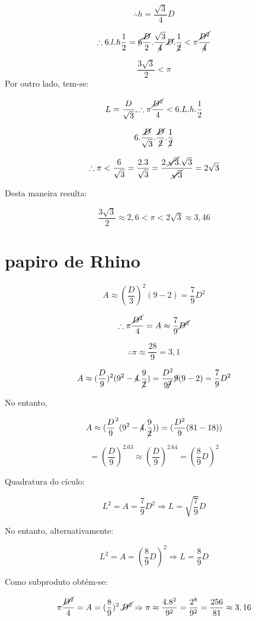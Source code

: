 \documentclass[a4paper, 12pt]{article}
\begin{document}
\[\therefore h= \frac{\sqrt{3}}{4}D\]

\[\therefore 6.l.h\frac{1}{2} = \cancel{6} \frac{\cancel{D}}{2}.\frac{\sqrt{3}}{\cancel{4}}\cancel{D}.\frac{1}{\cancel{2}} <\pi\frac{\cancel{D^2}}{\cancel{4}}\]

\[\frac{3\sqrt{3}}{2} < \pi\]
Por outro lado, tem-se:

\[L= \frac{D}{\sqrt{3}}, \therefore \pi \frac{\cancel{D^2}}{4} < 6.L.h.\frac{1}{2}\]

\[6.\frac{\cancel{D}}{\sqrt{3}}.\frac{\cancel{D}}{\cancel{2}}.\frac{1}{\cancel{2}}\]

\[\therefore \pi < \frac{6}{\sqrt{3}} = \frac{2.3}{\sqrt{3}} = \frac{2.\cancel{\sqrt{3}}.\sqrt{3}}{\cancel{\sqrt{3}}} = 2\sqrt{3}\]

Desta maneira resulta:

\[\frac{3\sqrt{3}}{2} \approx 2,6 < \pi < 2\sqrt{3} \approx 3,46\]
\section{papiro de Rhino}

\[A \approx (\frac{D}{3})^2 (9-2) = \frac{7}{9}D^2\]

\[\therefore \pi \frac{\cancel{D^2}}{4} = A \approx \frac{7}{9} \cancel{D^2}\]

\[\therefore \pi \approx \frac{28}{9} = 3,1\]

\[A \approx (\frac{D}{9})^2(9^2 - \cancel{4}.\frac{9}{\cancel{2}}) = \frac{D^2}{9\cancel{^2}}\cancel{9}(9-2) = \frac{7}{9}D^2\]

No entanto, 

\[A \approx (\frac{D}{9}^2 (9^2-\cancel{4}.\frac{9}{\cancel{2}})) = (\frac{D^2}{9} (81-18))\]

\[= (\frac{D}{9})^2.63 \approx (\frac{D}{9})^2.64=(\frac{8}{9}D)^2\]

Quadratura do cículo:

\[L^2 = A = \frac{7}{9}D^2 \Rightarrow L = \sqrt{\frac{7}{9}}D\]

No entanto, alternativamente: 

\[L^2 = A = (\frac{8}{9}D)^2 \Rightarrow L=\frac{8}{9}D\]

Como subproduto obtém-se:

\[\pi \frac{\cancel{D^2}}{4} = A = (\frac{8}{9})^2.\cancel{D^2} \Rightarrow \pi \approx \frac{4.8^2}{9^2} = \frac{2^8}{9^2} = \frac{256}{81} \approx 3,16\]
\end{document}
